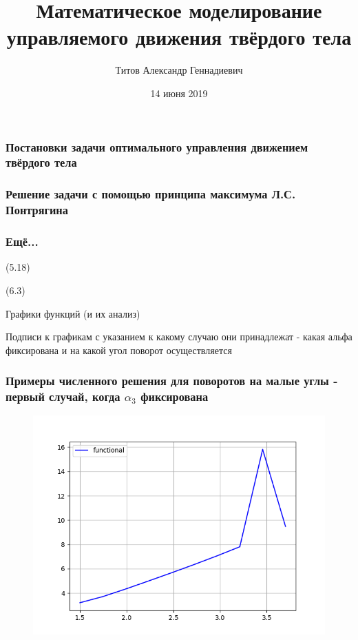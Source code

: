 \documentclass[10pt,utf8,presentation,notheorems,xcolor=dvipsnames,compress]{beamer}
\title[Мат. моделир. управления]{Математическое моделирование управляемого движения твёрдого тела}
\author[Титов А. Г.]{Титов Александр Геннадиевич}
\institute[010302]{«Прикладная математика и информатика»}
\date{14 июня 2019}
\begin{document}
\begin{frame}
\titlepage
\end{frame}

\begin{frame}
\frametitle{Постановки задачи оптимального управления движением твёрдого тела}
\end{frame}

\begin{frame}
\frametitle{Решение задачи с помощью принципа максимума Л.С. Понтрягина}
\end{frame}

\begin{frame}
\frametitle{Ещё...}
(5.18)

(6.3)

Графики функций (и их анализ)

Подписи к графикам с указанием к какому случаю они принадлежат - какая альфа фиксирована и на какой угол поворот осуществляется
\end{frame}

\begin{frame}
\frametitle{Примеры численного решения для поворотов на малые углы - первый случай, когда $\alpha_3$ фиксирована}
\begin{figure}[H]\label{one}
\center\includegraphics[scale=0.5]{fig/functional_1_5-3_7_50.png}
\caption{}
\end{figure}
\end{frame}
\end{document}
